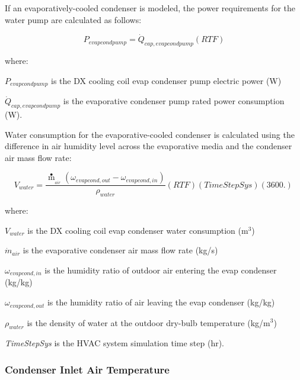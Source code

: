 If an evaporatively-cooled condenser is modeled, the power requirements for the water pump are calculated as follows:

\begin{equation}
{P_{evapcondpump}} = {\dot{Q}_{cap,evapcondpump}}\left( {RTF} \right)
\end{equation}

where:

\({P_{evapcondpump}}\) is the DX cooling coil evap condenser pump electric power (W)

\({\dot{Q}_{cap,evapcondpump}}\) is the evaporative condenser pump rated power consumption (W).

Water consumption for the evaporative-cooled condenser is calculated using the difference in air humidity level across the evaporative media and the condenser air mass flow rate:

\begin{equation}
{V_{water}} = \frac{{{{\mathop m\limits^ \bullet  }_{_{air}}}\left( {{\omega_{evapcond,out}} - {\omega_{evapcond,in}}} \right)}}{{{\rho_{water}}}}\left( {RTF} \right)\left( {TimeStepSys} \right)\left( {3600.} \right)\,
\end{equation}

where:

\({V_{water}}\) is the DX cooling coil evap condenser water consumption (m\(^{3}\))

\({\dot{m}_{air}}\) is the evaporative condenser air mass flow rate (kg/s)

\({\omega_{evapcond,in}}\) is the humidity ratio of outdoor air entering the evap condenser (kg/kg)

\({\omega_{evapcond,out}}\) is the humidity ratio of air leaving the evap condenser (kg/kg)

\({\rho_{water}}\) is the density of water at the outdoor dry-bulb temperature (kg/m\(^{3}\))

\emph{TimeStepSys} is the HVAC system simulation time step (hr).

\subsubsection{Condenser Inlet Air Temperature}\label{condenser-inlet-air-temperature}

